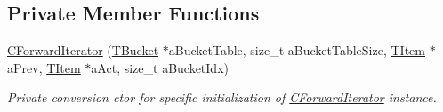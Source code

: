 \subsection*{Private Member Functions}
\begin{DoxyCompactItemize}
\item 
\hyperlink{class_c_hash_map_1_1_c_forward_iterator_a1e27b10a503e0bdddce6bacdd91d16e3}{C\+Forward\+Iterator} (\hyperlink{struct_c_hash_map_1_1_t_bucket}{T\+Bucket} $\ast$a\+Bucket\+Table, size\+\_\+t a\+Bucket\+Table\+Size, \hyperlink{struct_c_hash_map_1_1_t_item}{T\+Item} $\ast$a\+Prev, \hyperlink{struct_c_hash_map_1_1_t_item}{T\+Item} $\ast$a\+Act, size\+\_\+t a\+Bucket\+Idx)
\begin{DoxyCompactList}\small\item\em Private conversion c\textquotesingle{}tor for specific initialization of \hyperlink{class_c_hash_map_1_1_c_forward_iterator}{C\+Forward\+Iterator} instance. \end{DoxyCompactList}\end{DoxyCompactItemize}
